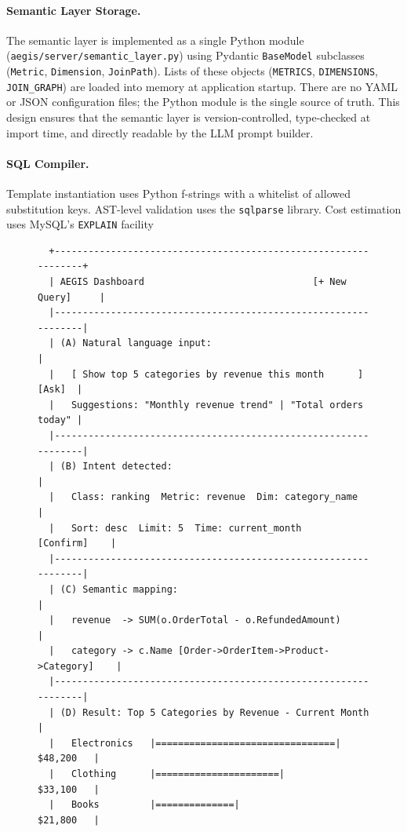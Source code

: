 \documentclass[11pt]{article}
\begin{document}
\paragraph{Semantic Layer Storage.} The semantic layer is implemented as a single Python module (\texttt{aegis/server/semantic\_layer.py}) using Pydantic \texttt{BaseModel} subclasses (\texttt{Metric}, \texttt{Dimension}, \texttt{JoinPath}). Lists of these objects (\texttt{METRICS}, \texttt{DIMENSIONS}, \texttt{JOIN\_GRAPH}) are loaded into memory at application startup. There are no YAML or JSON configuration files; the Python module is the single source of truth. This design ensures that the semantic layer is version-controlled, type-checked at import time, and directly readable by the LLM prompt builder.

\paragraph{SQL Compiler.} Template instantiation uses Python f-strings with a whitelist of allowed substitution keys. AST-level validation uses the \texttt{sqlparse} library. Cost estimation uses MySQL's \texttt{EXPLAIN} facility \begin{figure}[h]
\centering
\begin{verbatim}
  +----------------------------------------------------------------+
  | AEGIS Dashboard                              [+ New Query]     |
  |----------------------------------------------------------------|
  | (A) Natural language input:                                    |
  |   [ Show top 5 categories by revenue this month      ] [Ask]  |
  |   Suggestions: "Monthly revenue trend" | "Total orders today" |
  |----------------------------------------------------------------|
  | (B) Intent detected:                                           |
  |   Class: ranking  Metric: revenue  Dim: category_name         |
  |   Sort: desc  Limit: 5  Time: current_month      [Confirm]    |
  |----------------------------------------------------------------|
  | (C) Semantic mapping:                                          |
  |   revenue  -> SUM(o.OrderTotal - o.RefundedAmount)            |
  |   category -> c.Name [Order->OrderItem->Product->Category]    |
  |----------------------------------------------------------------|
  | (D) Result: Top 5 Categories by Revenue - Current Month       |
  |   Electronics   |================================|  $48,200   |
  |   Clothing      |======================|           $33,100   |
  |   Books         |==============|                   $21,800   |

\end{verbatim}
\end{figure}
\end{document}
